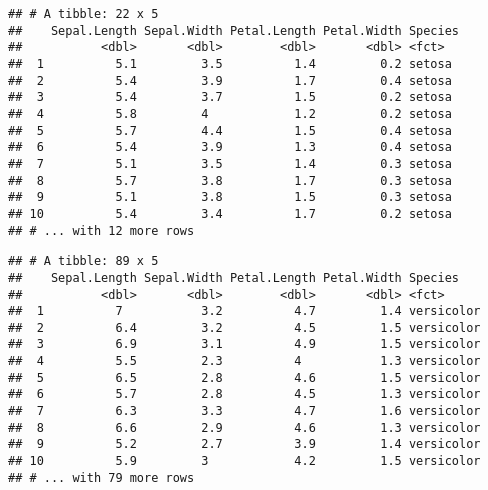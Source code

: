 \documentclass[]{book}
\newenvironment{Shaded}{\begin{snugshade}}{\end{snugshade}}
\newcommand{\KeywordTok}[1]{\textcolor[rgb]{0.13,0.29,0.53}{\textbf{#1}}}
\newcommand{\NormalTok}[1]{#1}
\newcommand{\OperatorTok}[1]{\textcolor[rgb]{0.81,0.36,0.00}{\textbf{#1}}}
\newcommand{\StringTok}[1]{\textcolor[rgb]{0.31,0.60,0.02}{#1}}
\begin{document}
\begin{verbatim}
## # A tibble: 22 x 5
##    Sepal.Length Sepal.Width Petal.Length Petal.Width Species
##           <dbl>       <dbl>        <dbl>       <dbl> <fct>  
##  1          5.1         3.5          1.4         0.2 setosa 
##  2          5.4         3.9          1.7         0.4 setosa 
##  3          5.4         3.7          1.5         0.2 setosa 
##  4          5.8         4            1.2         0.2 setosa 
##  5          5.7         4.4          1.5         0.4 setosa 
##  6          5.4         3.9          1.3         0.4 setosa 
##  7          5.1         3.5          1.4         0.3 setosa 
##  8          5.7         3.8          1.7         0.3 setosa 
##  9          5.1         3.8          1.5         0.3 setosa 
## 10          5.4         3.4          1.7         0.2 setosa 
## # ... with 12 more rows
\end{verbatim}

\begin{Shaded}
\end{Shaded}

\begin{verbatim}
## # A tibble: 89 x 5
##    Sepal.Length Sepal.Width Petal.Length Petal.Width Species   
##           <dbl>       <dbl>        <dbl>       <dbl> <fct>     
##  1          7           3.2          4.7         1.4 versicolor
##  2          6.4         3.2          4.5         1.5 versicolor
##  3          6.9         3.1          4.9         1.5 versicolor
##  4          5.5         2.3          4           1.3 versicolor
##  5          6.5         2.8          4.6         1.5 versicolor
##  6          5.7         2.8          4.5         1.3 versicolor
##  7          6.3         3.3          4.7         1.6 versicolor
##  8          6.6         2.9          4.6         1.3 versicolor
##  9          5.2         2.7          3.9         1.4 versicolor
## 10          5.9         3            4.2         1.5 versicolor
## # ... with 79 more rows
\end{verbatim}

\begin{Shaded}
\end{Shaded}
\end{document}
